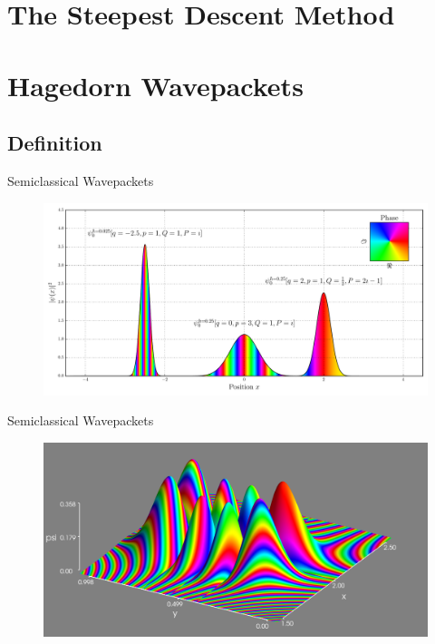 \documentclass{beamer}
\begin{document}
\section{The Steepest Descent Method}




\section{Hagedorn Wavepackets}
\subsection{Definition}


\begin{frame}{Semiclassical Wavepackets}
  \begin{figure}
    \centering
    \includegraphics[width=\linewidth]{./fig/wavepackets.pdf}
  \end{figure}
\end{frame}

\begin{frame}{Semiclassical Wavepackets}
  \begin{figure}
    \centering
    \includegraphics[width=\linewidth]{./fig/wavepackets_2d.png}
  \end{figure}
\end{frame}
\end{document}
